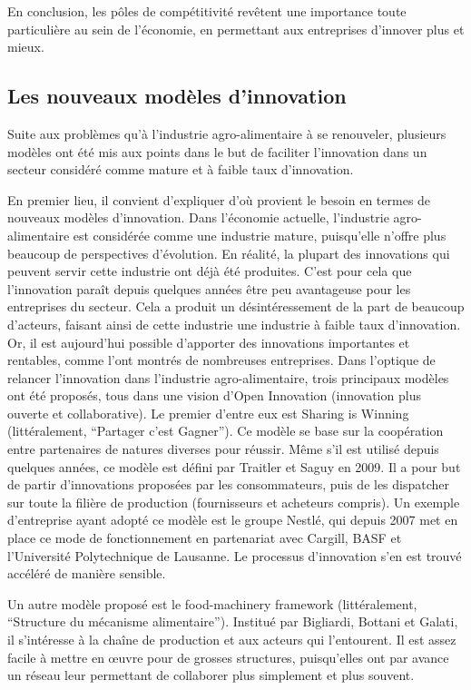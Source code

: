 \documentclass[a4paper,12pt]{report}
\begin{document}
		En conclusion, les pôles de compétitivité revêtent une importance toute particulière au sein de l’économie, en permettant aux entreprises d’innover plus et mieux.
				
		\subsection{Les nouveaux modèles d’innovation}
			Suite aux problèmes qu’à l’industrie agro-alimentaire à se renouveler, plusieurs modèles ont été mis aux points dans le but de faciliter l’innovation dans un secteur considéré comme mature et à faible taux d’innovation.
			
			En premier lieu, il convient d’expliquer d’où provient le besoin en termes de nouveaux modèles d’innovation. Dans l’économie actuelle, l’industrie agro-alimentaire est considérée comme une industrie mature, puisqu’elle n’offre plus beaucoup de perspectives d’évolution. En réalité, la plupart des innovations qui peuvent servir cette industrie ont déjà été produites. C’est pour cela que l’innovation paraît depuis quelques années être peu avantageuse pour les entreprises du secteur. Cela a produit un désintéressement de la part de beaucoup d’acteurs, faisant ainsi de cette industrie une industrie à faible taux d’innovation. Or, il est aujourd’hui possible d’apporter des innovations importantes et rentables, comme l’ont montrés de nombreuses entreprises.
			Dans l’optique de relancer l’innovation dans l’industrie agro-alimentaire, trois principaux modèles ont été proposés, tous dans une vision d’Open Innovation (innovation plus ouverte et collaborative)\cite{OpenInnovation}. Le premier d’entre eux est Sharing is Winning (littéralement, “Partager c’est Gagner”)\cite{SiW}. Ce modèle se base sur la coopération entre partenaires de natures diverses pour réussir. Même s’il est utilisé depuis quelques années, ce modèle est défini par Traitler et Saguy en 2009. Il a pour but de partir d’innovations proposées par les consommateurs, puis de les dispatcher sur toute la filière de production (fournisseurs et acheteurs compris)\cite{OIFr}. Un exemple d’entreprise ayant adopté ce modèle est le groupe Nestlé\cite{NestleOI}, qui depuis 2007 met en place ce mode de fonctionnement en partenariat avec Cargill, BASF et l'Université Polytechnique de Lausanne. Le processus d’innovation s’en est trouvé accéléré de manière sensible.	
			
			Un autre modèle proposé est le food-machinery framework (littéralement, “Structure du mécanisme alimentaire”). Institué par Bigliardi, Bottani et Galati, il s’intéresse à la chaîne de production et aux acteurs qui l’entourent\cite{FMF}. Il est assez facile à mettre en œuvre pour de grosses structures, puisqu’elles ont par avance un réseau leur permettant de collaborer plus simplement et plus souvent.
			
\end{document}
